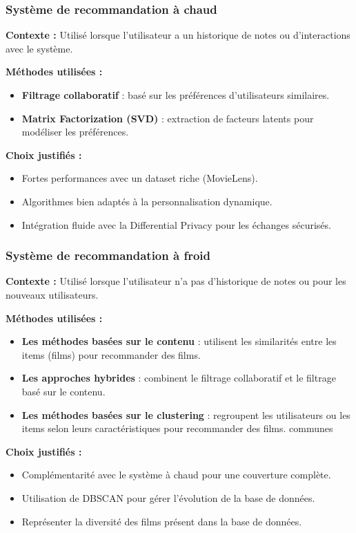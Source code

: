 \documentclass{beamer}
\begin{document}
\begin{frame}
    \scriptsize
    \frametitle{Système de recommandation à chaud}
    \textbf{Contexte :} Utilisé lorsque l’utilisateur a un historique de notes ou d’interactions avec le système.

    \vspace{0.3cm}
    \textbf{Méthodes utilisées :}
    \begin{itemize}
        \item \textbf{Filtrage collaboratif} : basé sur les préférences d’utilisateurs similaires.
        \item \textbf{Matrix Factorization (SVD)} : extraction de facteurs latents pour modéliser les préférences.
    \end{itemize}

    \vspace{0.3cm}
    \textbf{Choix justifiés :}
    \begin{itemize}
        \item Fortes performances avec un dataset riche (MovieLens).
        \item Algorithmes bien adaptés à la personnalisation dynamique.
        \item Intégration fluide avec la Differential Privacy pour les échanges sécurisés.
    \end{itemize}
\end{frame}

\begin{frame}
    \scriptsize
    \frametitle{Système de recommandation à froid}
    \textbf{Contexte :} Utilisé lorsque l’utilisateur n’a pas d’historique de notes ou pour les nouveaux utilisateurs.

    \vspace{0.3cm}
    \textbf{Méthodes utilisées : }
    \begin{itemize}
        \item \textbf{Les méthodes basées sur le contenu} : utilisent les similarités entre les items (films) pour recommander des films.
        \item \textbf{Les approches hybrides} : combinent le filtrage collaboratif et le filtrage basé sur le contenu.
        \item \textbf{Les méthodes basées sur le clustering} : regroupent les utilisateurs ou les items selon leurs caractéristiques pour recommander des films.
              communes
    \end{itemize}

    \vspace{0.3cm}
    \textbf{Choix justifiés :}
    \begin{itemize}
        \item Complémentarité avec le système à chaud pour une couverture complète.
        \item Utilisation de DBSCAN pour gérer l'évolution de la base de données.
        \item Représenter la diversité des films présent dans la base de données.
    \end{itemize}
\end{frame}
\end{document}
